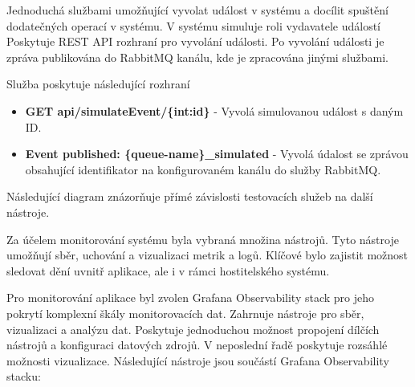
Jednoduchá službami umožňující vyvolat událost v systému a docílit spuštění dodatečných operací v systému. V systému simuluje roli vydavatele událostí Poskytuje REST API rozhraní pro vyvolání události. Po vyvolání události je zpráva publikována do RabbitMQ kanálu, kde je zpracována jinými službami.

Služba poskytuje následující rozhraní

\begin{itemize}
    \item \textbf{GET api/simulateEvent/\{int:id\}} - Vyvolá simulovanou událost s daným ID.
    \item \textbf{Event published: \{queue-name\}\_simulated} - Vyvolá údalost se zprávou obsahující identifikator na konfigurovaném kanálu do služby RabbitMQ.
\end{itemize}

Následující diagram znázorňuje přímé závislosti testovacích služeb na další nástroje.



Za účelem monitorování systému byla vybraná množina nástrojů. Tyto nástroje umožňují sběr, uchování a vizualizaci metrik a logů. Klíčové bylo zajistit možnost sledovat dění uvnitř aplikace, ale i v rámci hostitelského systému. 


Pro monitorování aplikace byl zvolen Grafana Observability stack pro jeho pokrytí komplexní škály monitorovacích dat. Zahrnuje nástroje pro sběr, vizualizaci a analýzu dat. Poskytuje jednoduchou možnost propojení dílčích nástrojů a konfiguraci datových zdrojů. V neposlední řadě poskytuje rozsáhlé možnosti vizualizace. Následující nástroje jsou součástí Grafana Observability stacku:

